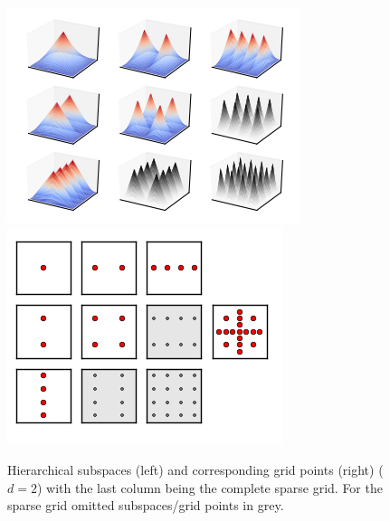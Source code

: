 \begin{figure}[t!]
  \centering
  \includegraphics{images/figure_2.png}
  \includegraphics{images/figure_3.png}
  \caption{Hierarchical subspaces (left) and corresponding grid points
    (right) ($d = 2$) with the last column being the complete sparse grid.
    For the sparse grid omitted subspaces/grid points in grey.
    \label{fig:fig2}}
\end{figure}


